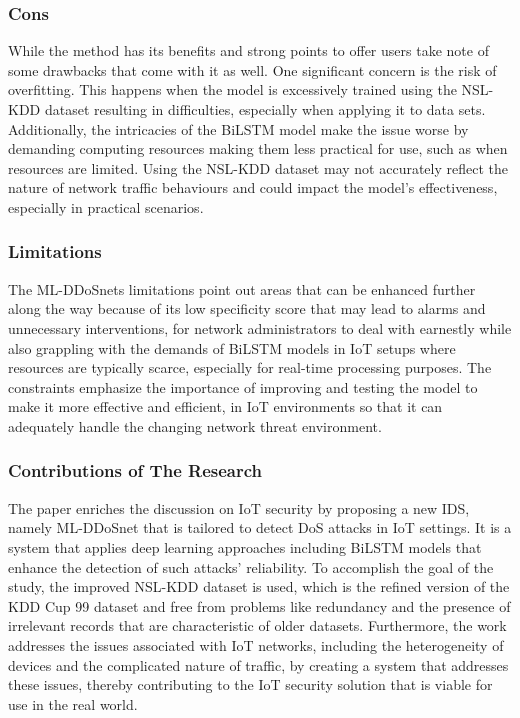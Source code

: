 \documentclass[a4paper, 12pt]{article}
\begin{document}
\subsubsection{Cons}
While the method has its benefits and strong points to offer users take note of some drawbacks that come with it as well. One significant concern is the risk of overfitting. This happens when the model is excessively trained using the NSL-KDD dataset resulting in difficulties, especially when applying it to data sets. Additionally, the intricacies of the BiLSTM model make the issue worse by demanding computing resources making them less practical for use, such as when resources are limited. Using the NSL-KDD dataset may not accurately reflect the nature of network traffic behaviours and could impact the model's effectiveness, especially in practical scenarios.

\subsubsection{Limitations}
The ML-DDoSnets limitations point out areas that can be enhanced further along the way because of its low specificity score that may lead to alarms and unnecessary interventions, for network administrators to deal with earnestly while also grappling with the demands of BiLSTM models in IoT setups where resources are typically scarce, especially for real-time processing purposes. The constraints emphasize the importance of improving and testing the model to make it more effective and efficient, in IoT environments so that it can adequately handle the changing network threat environment. 

\subsubsection{Contributions of The Research}
The paper enriches the discussion on IoT security by proposing a new IDS, namely ML-DDoSnet that is tailored to detect DoS attacks in IoT settings. It is a system that applies deep learning approaches including BiLSTM models that enhance the detection of such attacks’ reliability. To accomplish the goal of the study, the improved NSL-KDD dataset is used, which is the refined version of the KDD Cup 99 dataset and free from problems like redundancy and the presence of irrelevant records that are characteristic of older datasets. Furthermore, the work addresses the issues associated with IoT networks, including the heterogeneity of devices and the complicated nature of traffic, by creating a system that addresses these issues, thereby contributing to the IoT security solution that is viable for use in the real world.
\end{document}
